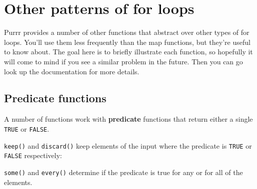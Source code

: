 \documentclass[]{book}
\newenvironment{Shaded}{\begin{snugshade}}{\end{snugshade}}
\newcommand{\KeywordTok}[1]{\textcolor[rgb]{0.13,0.29,0.53}{\textbf{{#1}}}}
\newcommand{\DecValTok}[1]{\textcolor[rgb]{0.00,0.00,0.81}{{#1}}}
\newcommand{\StringTok}[1]{\textcolor[rgb]{0.31,0.60,0.02}{{#1}}}
\newcommand{\CommentTok}[1]{\textcolor[rgb]{0.56,0.35,0.01}{\textit{{#1}}}}
\newcommand{\NormalTok}[1]{{#1}}
\begin{document}
\section{Other patterns of for loops}\label{other-patterns-of-for-loops}

Purrr provides a number of other functions that abstract over other
types of for loops. You'll use them less frequently than the map
functions, but they're useful to know about. The goal here is to briefly
illustrate each function, so hopefully it will come to mind if you see a
similar problem in the future. Then you can go look up the documentation
for more details.

\subsection{Predicate functions}\label{predicate-functions}

A number of functions work with \textbf{predicate} functions that return
either a single \texttt{TRUE} or \texttt{FALSE}.

\texttt{keep()} and \texttt{discard()} keep elements of the input where
the predicate is \texttt{TRUE} or \texttt{FALSE} respectively:

\begin{Shaded}
\end{Shaded}

\texttt{some()} and \texttt{every()} determine if the predicate is true
for any or for all of the elements.

\begin{Shaded}
\end{Shaded}
\end{document}
